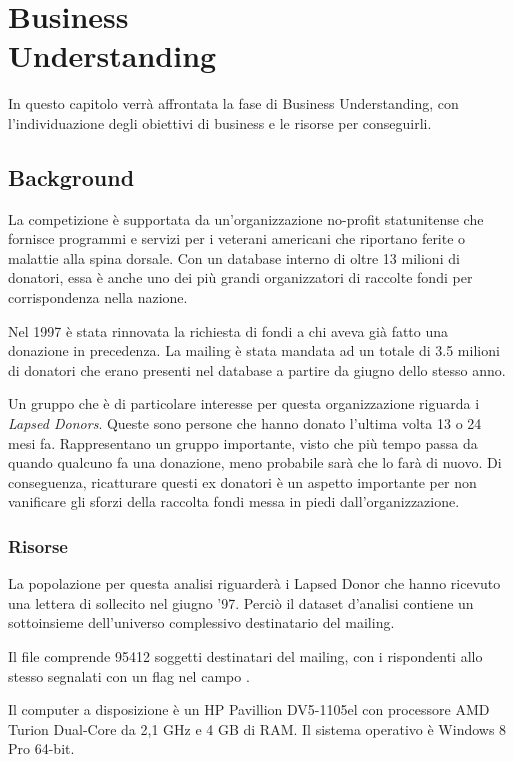 \chapter[Business Understanding]{Business\\Understanding}
\label{ch:bisund}
In questo capitolo verrà affrontata la fase di Business Understanding, con l'individuazione degli obiettivi di business e le risorse per conseguirli.

\section{Background}
La competizione è supportata da un'organizzazione no-profit statunitense che fornisce programmi e servizi per i veterani americani che riportano ferite o malattie alla spina dorsale. Con un database interno di oltre 13 milioni di donatori, essa è anche uno dei più grandi organizzatori di raccolte fondi per corrispondenza nella nazione.

Nel 1997 è stata rinnovata la richiesta di fondi a chi aveva già fatto una donazione in precedenza. La mailing è stata mandata ad un totale di 3.5 milioni di donatori che erano presenti nel database a partire da giugno dello stesso anno.

Un gruppo che è di particolare interesse per questa organizzazione riguarda i \emph{Lapsed Donors}. Queste sono persone che hanno donato l'ultima volta 13 o 24 mesi fa. Rappresentano un gruppo importante, visto che più tempo passa da quando qualcuno fa una donazione, meno probabile sarà che lo farà di nuovo. Di conseguenza, ricatturare questi ex donatori è un aspetto importante per non vanificare gli sforzi della raccolta fondi messa in piedi dall'organizzazione.

\subsection{Risorse}

La popolazione per questa analisi riguarderà i Lapsed Donor che hanno ricevuto una lettera di sollecito nel giugno '97. Perciò il dataset d'analisi contiene un sottoinsieme dell'universo complessivo destinatario del mailing.

Il file comprende 95412 soggetti destinatari del mailing, con i rispondenti allo stesso segnalati con un flag nel campo \tb.

Il computer a disposizione è un HP Pavillion DV5-1105el con processore AMD Turion Dual-Core da 2,1 GHz e 4 GB di RAM. Il sistema operativo è Windows 8 Pro 64-bit.

